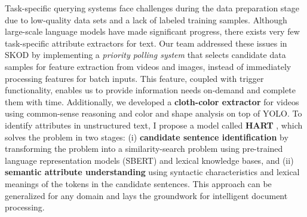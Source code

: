     Task-specific querying systems face challenges during the data preparation stage due to low-quality data sets and a lack of labeled training samples. Although large-scale language models have made significant progress, there exists very few task-specific attribute extractors for text. Our team addressed these issues in SKOD by implementing a \textit{priority polling system} that selects candidate data samples for feature extraction from videos and images, instead of immediately processing features for batch inputs. This feature, coupled with trigger functionality, enables us to provide information needs on-demand and complete them with time. Additionally, we developed a \textbf{cloth-color extractor} for videos using common-sense reasoning and color and shape analysis \cite{stonebraker2020surveillance} on top of YOLO. To identify attributes in unstructured text, I propose a model called \textbf{HART} \cite{solaiman2022femmir}, which solves the problem in two stages: (i) \textbf{candidate sentence identification} by transforming the problem into a similarity-search problem using pre-trained language representation models (SBERT) and lexical knowledge bases, and (ii) \textbf{semantic attribute understanding} using syntactic characteristics and lexical meanings of the tokens in the candidate sentences. This approach can be generalized for any domain and lays the groundwork for intelligent document processing.
